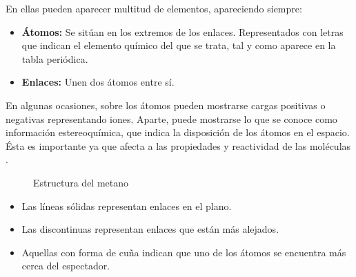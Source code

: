 \noindent En ellas pueden aparecer multitud de elementos, apareciendo siempre:
\begin{itemize}
    \item \textbf{Átomos:} Se sitúan en los extremos de los enlaces. Representados con letras que indican el elemento químico del que se trata, tal y como aparece en la tabla periódica.
    \item \textbf{Enlaces:} Unen dos átomos entre sí. 
\end{itemize}

 En algunas ocasiones, sobre los átomos pueden mostrarse cargas positivas o negativas representando iones. Aparte, puede mostrarse lo que se conoce como información estereoquímica, que indica la disposición de los átomos en el espacio. Ésta es importante ya que afecta a las propiedades y reactividad de las moléculas \cite{estereoquimica,structrep}.

 \begin{figure}[H]
\centering
    \caption{Estructura del metano} \label{fig:figura2}
\end{figure}

\begin{itemize}
    \item Las líneas sólidas representan enlaces en el plano.
    \item Las discontinuas representan enlaces que están más alejados.
    \item Aquellas con forma de cuña indican que uno de los átomos se encuentra más cerca del espectador. 
\end{itemize}

